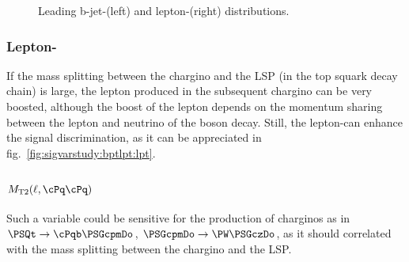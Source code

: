 \begin{figure}
\caption{\label{fig:sigvarstudy:bptlpt} Leading b-jet-\pt (left) and lepton-\pt (right) distributions.}
\end{figure}

\subsubsection{Lepton-\pt}

If the mass splitting between  the chargino and the LSP (in the top squark decay chain) is large, the lepton produced in the subsequent chargino can be very boosted, although the boost of the lepton depends on the momentum sharing between the lepton and neutrino of the \PW boson decay. Still, the lepton-\pt can enhance the signal discrimination, as it can be appreciated in fig.~\ref{fig:sigvarstudy:bptlpt:lpt}.

\subsubsection{$\MTt(\ell,\cPq\cPq)$}

Such a variable could be sensitive for the production of charginos as in $\PSQt\to\cPqb\PSGcpmDo$, $\PSGcpmDo\to\PW\PSGczDo$, as it should correlated with the mass splitting between the chargino and the LSP.


